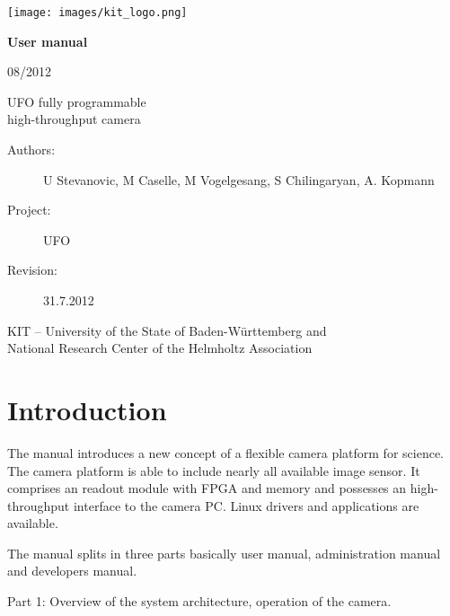 \documentclass[12pt,a4paper,twoside]{book}
\begin{document}
\begin{titlepage}
\texttt{[image: images/kit\_logo.png]}


\hspace{4cm}
\begin{minipage}{12cm}
\vspace{3cm}
{\LARGE\bf User manual}

\vspace{0.2cm}
08/2012

\vspace{2.5cm}
{\LARGE UFO fully programmable\\[0.7ex]
 high-throughput camera}

\end{minipage}

\vfill
\hspace{4cm}
\begin{minipage}{12cm}
\begin{description}
\item[\textnormal{Authors:}] U Stevanovic, M Caselle, M Vogelgesang, S Chilingaryan, A. Kopmann
\item[\textnormal{Project:}] UFO 
\item[\textnormal{Revision:}] 31.7.2012 
\end{description}

\vspace{3cm}
KIT -- University of the State of Baden-Württemberg and\\
National Research Center of the Helmholtz Association
\end{minipage}
\end{titlepage}

\tableofcontents


\chapter*{Introduction}


The manual introduces a new concept of a flexible camera platform for science. The camera platform is able
to include nearly all available image sensor. It comprises an readout module with FPGA and memory and 
possesses an high-throughput interface to the camera PC. Linux drivers and applications are available.

The manual splits in three parts basically user manual, administration manual and developers manual.

Part 1: Overview of the system architecture, operation of the camera. 
\end{document}
